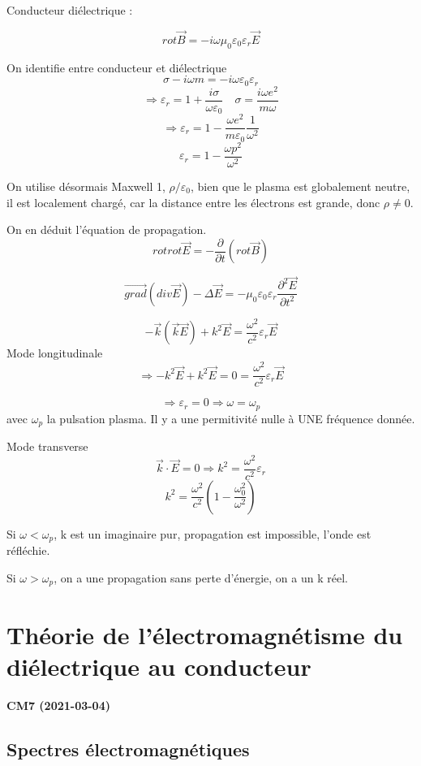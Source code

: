 \documentclass[12pt,a4paper]{report}
\begin{document}
Conducteur diélectrique :

\[
	rot \vec{B} = -i \omega \mu_0 \varepsilon_0 \varepsilon_r \vec{E}
\]

On identifie entre conducteur et diélectrique
\[
	\sigma - i \omega m= -i \omega \varepsilon_0 \varepsilon_r
\]
\[
	\Rightarrow \varepsilon_r = 1 + \dfrac{i \sigma}{\omega \varepsilon_0} \quad \sigma = \dfrac{i \omega e^2}{m \omega}
\]
\[
	\Rightarrow \varepsilon_r = 1 - \dfrac{\omega e^2}{m \varepsilon_0} \dfrac{1}{\omega^2}
\]
\[
	\varepsilon_r = 1 - \dfrac{\omega p^2}{\omega^2}
\]

On utilise désormais Maxwell 1, \(\rho / \varepsilon_0\), bien que le plasma est globalement neutre, il est localement chargé, car la distance entre les électrons est grande, donc \(\rho \neq 0\).

On en déduit l'équation de propagation.
\[
	rot rot \vec{E} = -\dfrac{\partial}{\partial t} \left( rot \vec{B} \right)
\]

\[
	\vec{grad}(div \vec{E})  - \Delta \vec{E} = -\mu_0 \varepsilon_0 \varepsilon_r \dfrac{\partial^2 \vec{E}}{\partial t^2}
\]

\[
	-\vec{k} (\vec{k} \vec{E}) + k^2 \vec{E} = \dfrac{\omega^2}{c^2} \varepsilon_r \vec{E}
\]
Mode longitudinale
\[
	\Rightarrow -k^2 \vec{E} + k^2 \vec{E} = 0 = \dfrac{\omega^2}{c^2} \varepsilon_r \vec{E}
\]

\[
	\Rightarrow \varepsilon_r = 0 \Rightarrow \omega = \omega_p
\]
avec \(\omega_p\) la pulsation plasma. Il y a une permitivité nulle à UNE fréquence donnée.

Mode transverse
\[
	\vec{k} \cdot \vec{E} = 0 \Rightarrow k^2 = \dfrac{\omega^2}{c^2} \varepsilon_r 
\]
\[
	k^2 = \dfrac{\omega^2}{c^2} \left( 1 - \dfrac{\omega_0^2}{\omega^2} \right)
\]

Si \(\omega < \omega_p\), k est un imaginaire pur, propagation est impossible, l'onde est réfléchie.

Si \(\omega > \omega_p\), on a une propagation sans perte d'énergie, on a un k réel.

\chapter{Théorie de l'électromagnétisme du diélectrique au conducteur}

\begin{center}
\textbf{CM7 (2021-03-04)}
\end{center}

\section{Spectres électromagnétiques}
\end{document}
